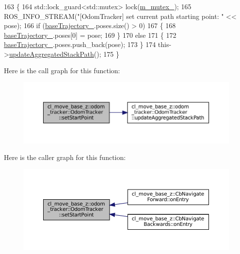 \begin{DoxyCode}
163 \{
164     std::lock\_guard<std::mutex> lock(\hyperlink{classcl__move__base__z_1_1odom__tracker_1_1OdomTracker_aa371639e1eee269273dec8d3ab9dba0f}{m\_mutex\_});
165     ROS\_INFO\_STREAM(\textcolor{stringliteral}{"[OdomTracker] set current path starting point: "} << pose);
166     \textcolor{keywordflow}{if} (\hyperlink{classcl__move__base__z_1_1odom__tracker_1_1OdomTracker_a466d18a86df049f0f680e043bb5ea91f}{baseTrajectory\_}.poses.size() > 0)
167     \{
168         \hyperlink{classcl__move__base__z_1_1odom__tracker_1_1OdomTracker_a466d18a86df049f0f680e043bb5ea91f}{baseTrajectory\_}.poses[0] = pose;
169     \}
170     \textcolor{keywordflow}{else}
171     \{
172         \hyperlink{classcl__move__base__z_1_1odom__tracker_1_1OdomTracker_a466d18a86df049f0f680e043bb5ea91f}{baseTrajectory\_}.poses.push\_back(pose);
173     \}
174     this->\hyperlink{classcl__move__base__z_1_1odom__tracker_1_1OdomTracker_a7922f1e1e688a2ed62d32d9914985a9f}{updateAggregatedStackPath}();
175 \}
\end{DoxyCode}
Here is the call graph for this function\+:
\nopagebreak
\begin{figure}[H]
\begin{center}
\leavevmode
\includegraphics[width=350pt]{classcl__move__base__z_1_1odom__tracker_1_1OdomTracker_a9f4989c6353022c2ec3b0546c09bf3bc_cgraph}
\end{center}
\end{figure}
Here is the caller graph for this function\+:
\nopagebreak
\begin{figure}[H]
\begin{center}
\leavevmode
\includegraphics[width=350pt]{classcl__move__base__z_1_1odom__tracker_1_1OdomTracker_a9f4989c6353022c2ec3b0546c09bf3bc_icgraph}
\end{center}
\end{figure}
